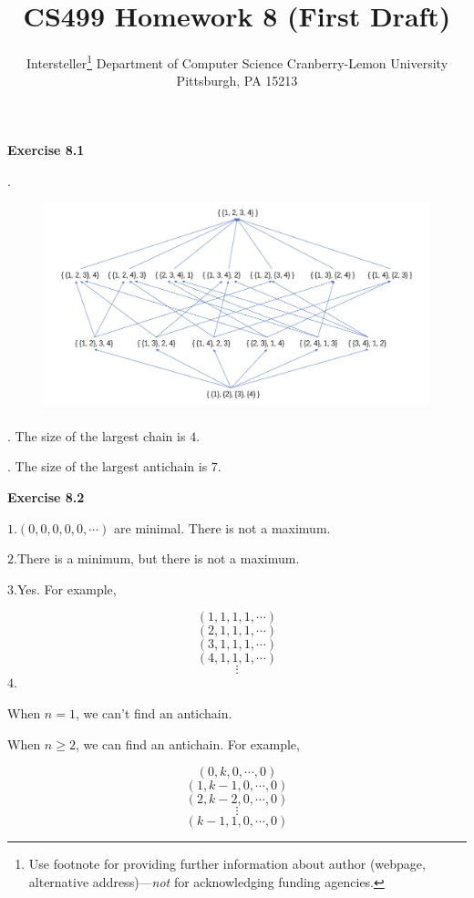 \documentclass{article} %
\title{CS499 Homework 8 (First Draft)}
\author{
	Intersteller\thanks{ Use footnote for providing further information
		about author (webpage, alternative address)---\emph{not} for acknowledging
		funding agencies.}
	Department of Computer Science
	Cranberry-Lemon University
	Pittsburgh, PA 15213
}
\begin{document}
	\maketitle
	\textbf{Exercise 8.1}\par
	.\par
  	\begin{figure}[H]
  	\centering
  	\includegraphics[scale=0.5]{8_1.png}
  	\caption{}
  	\label{}
  	\end{figure}
	. The size of the largest chain is $4$.\par
	 . The size of the largest antichain is $7$.\par

\textbf{Exercise 8.2}\par
    $1.(0,0,0,0,0,\cdots)$ are minimal. There is not a maximum.\par
    $2.$There is a minimum, but there is not a maximum.\par
    $3.$Yes. For example,\par
    $$(1,1,1,1,\cdots)$$
    $$(2,1,1,1,\cdots)$$
    $$(3,1,1,1,\cdots)$$
    $$(4,1,1,1,\cdots)$$
    $$\vdots$$
    $4.$\par
    When $n=1$, we can't find an antichain.\par
    When $n\ge 2$, we can find an antichain. For example,\par
    $$(0,k,0,\cdots,0)$$
    $$(1,k-1,0,\cdots,0)$$
    $$(2,k-2,0,\cdots,0)$$
    $$\vdots$$
    $$(k-1,1,0,\cdots,0)$$
    
\end{document}
